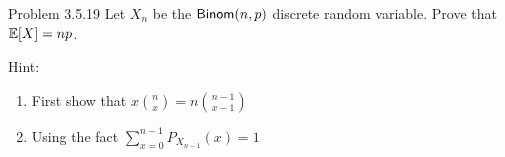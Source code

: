 \begin{problem}{Problem 3.5.19}
    Let $X_n$ be the $\mathsf{Binom}(n, p)$ discrete random variable. Prove that $\E{X}=np$.

    Hint:{
        \begin{enumerate}
            \item First show that $x\binom{n}{x}=n\binom{n-1}{x-1}$
            \item Using the fact $\sum_{x=0}^{n-1}P_{X_{n-1}}(x)=1$
        \end{enumerate}
    }
\end{problem}